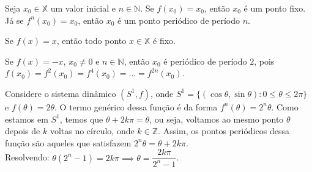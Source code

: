 \documentclass[../IC.tex]{subfiles}
\begin{document}
	\begin{definicao}
		Seja $x_0 \in \mathbb{X}$ um valor inicial e $n \in \mathbb{N}$. Se $f(x_0) = x_0$, então $x_0$ é um ponto fixo. Já se $f^n(x_0) = x_0$, então $x_0$ é um ponto periódico de período $n$.
	\end{definicao}
	\begin{exemplo}
		Se $f(x) = x$, então todo ponto $x \in \mathbb{X}$ é fixo.
	\end{exemplo}
	\begin{exemplo}
		Se $f(x) = -x$, $x_0 \neq 0$ e $n \in \mathbb{N}$, então $x_0$ é periódico de período $2$, pois $f(x_0) = f^2(x_0) = f^4(x_0) = ... = f^{2n}(x_0)$.
	\end{exemplo}
	\begin{exemplo}
		Considere o sistema dinâmico $(S^1, f)$, onde $S^1 = \{(\cos{\theta}, \sin{\theta}) : 0 \leq \theta \leq 2\pi\}$ e $f(\theta) = 2\theta$.		
		O termo genérico dessa função é da forma $f^n(\theta) = 2^n\theta$. Como estamos em $S^1$, temos que $\theta + 2k\pi = \theta$, ou seja, voltamos ao mesmo ponto $\theta$ depois de $k$ voltas no círculo, onde $k \in \mathbb{Z}$. Assim, os pontos periódicos dessa função são aqueles que satisfazem $2^n\theta = \theta + 2k\pi$.\\
		Resolvendo: $\theta(2^n - 1) = 2k\pi \implies \theta = \dfrac{2k\pi}{2^n - 1}$.
	\end{exemplo}
\end{document}
